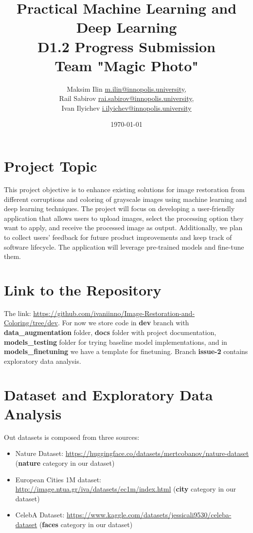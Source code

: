 \documentclass{article}
\title{Practical Machine Learning and Deep Learning\\D1.2 Progress Submission\\
Team "Magic Photo"}
\author{Maksim Ilin \href{mailto:m.ilin@innopolis.university}{m.ilin@innopolis.university},\\ Rail Sabirov \href{mailto:rai.sabirov@innopolis.university}{rai.sabirov@innopolis.university},\\ Ivan Ilyichev \href{mailto:i.ilyichev@innopolis.university}{i.ilyichev@innopolis.university}}
\date{\today}
\begin{document}
\maketitle

\section{Project Topic}
\par This project objective is to enhance existing solutions for image restoration from different corruptions and coloring of grayscale images using machine learning and deep learning techniques. The project will focus on developing a user-friendly application that allows users to upload images, select the processing option they want to apply, and receive the processed image as output. Additionally, we plan to collect users' feedback for future product improvements and keep track of software lifecycle. The application will leverage pre-trained models and fine-tune them. 

\section{Link to the Repository}
\par The link: \url{https://github.com/ivaniinno/Image-Restoration-and-Coloring/tree/dev}. For now we store code in \textbf{dev} branch with \textbf{data\_augmentation} folder, \textbf{docs} folder with project documentation, \textbf{models\_testing} folder for trying baseline model implementations, and in \textbf{models\_finetuning} we have a template for finetuning. Branch \textbf{issue-2} contains exploratory data analysis.


\section{Dataset and Exploratory Data Analysis}

\par Out datasets is composed from three sources:

\begin{itemize}
    \item Nature Dataset: \url{https://huggingface.co/datasets/mertcobanov/nature-dataset} (\textbf{nature} category in our dataset)
    \item European Cities 1M dataset: \url{http://image.ntua.gr/iva/datasets/ec1m/index.html} (\textbf{city} category in our dataset)
    \item CelebA Dataset: \url{https://www.kaggle.com/datasets/jessicali9530/celeba-dataset} (\textbf{faces} category in our dataset)
\end{itemize}
\end{document}
